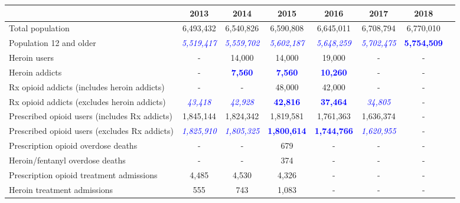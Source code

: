 \documentclass[12pt]{article}
\begin{document}
\begin{tabular}{|l|c|c|c|c|c|c|l}
\hline
 & \scriptsize{2013} & \scriptsize{2014} & \scriptsize{2015} & \scriptsize{2016} & \scriptsize{2017} & \scriptsize{2018}\\
\hline
\scriptsize
Total population & \scriptsize{6,493,432} & \scriptsize{6,540,826} & \scriptsize{6,590,808} & \scriptsize{6,645,011} & \scriptsize{6,708,794} & \scriptsize{6,770,010}\\
\scriptsize
Population 12 and older & \scriptsize{\textit{\textcolor{blue}{5,519,417}}} & \scriptsize{\textit{\textcolor{blue}{5,559,702}}} & \scriptsize{\textit{\textcolor{blue}{5,602,187}}} & \scriptsize{\textit{\textcolor{blue}{5,648,259}}} & \scriptsize{\textit{\textcolor{blue}{5,702,475}}} & \scriptsize{\textbf{\textcolor{blue}{5,754,509}}} \\
\scriptsize
Heroin users& - &\scriptsize{14,000} & \scriptsize{14,000} & \scriptsize{19,000}  & - &-\\
\scriptsize
Heroin addicts & - &\scriptsize{\textcolor{blue}{\textbf{7,560}}} & \scriptsize{\textcolor{blue}{\textbf{7,560}}} & \scriptsize{\textcolor{blue}{\textbf{10,260}}}  & - &-\\
\scriptsize
Rx opioid addicts (includes heroin addicts) & - &  - & \scriptsize{48,000}
& \scriptsize{42,000} & - &-\\
\scriptsize
Rx opioid addicts (excludes heroin addicts) & \scriptsize{\textit{\textcolor{blue}{43,418}}} & \scriptsize{\textit{\textcolor{blue}{42,928}}} & \scriptsize{\textcolor{blue}{\textbf{42,816}}
} & \scriptsize{\textcolor{blue}{\textbf{37,464}}} & \scriptsize{\textit{\textcolor{blue}{34,805}}} &-\\
\scriptsize
Prescribed opioid users (includes Rx addicts) & \scriptsize{1,845,144} &\scriptsize{1,824,342} & \scriptsize{1,819,581} & \scriptsize{1,761,363} &  \scriptsize{1,636,374} &-\\
\scriptsize
Prescribed opioid users (excludes Rx addicts)   & \scriptsize{\textit{\textcolor{blue}{1,825,910}}} &\scriptsize{\textit{\textcolor{blue}{1,805,325}
}} & \scriptsize{\textcolor{blue}{\textbf{1,800,614}}} & \scriptsize{\textcolor{blue}{\textbf{1,744,766}}} &  \scriptsize{\textit{\textcolor{blue}{1,620,955}
}} &-\\
\scriptsize
Prescription opioid overdose deaths & - & - & \scriptsize{679} & -  & - &-\\
\scriptsize
Heroin/fentanyl overdose deaths & - & - & \scriptsize{374} & -  & - &-\\
\scriptsize
Prescription opioid treatment admissions & \scriptsize{4,485} & \scriptsize{4,530} & \scriptsize{4,326} & -  & - &-\\
\scriptsize
Heroin treatment admissions & \scriptsize{555} & \scriptsize{743} & \scriptsize{1,083} & -  & - &-\\
\hline
\end{tabular} \\
\label{tab:template}
\\
\end{document}
